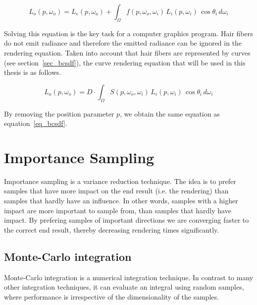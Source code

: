 \documentclass[11pt,a4paper]{report}
\begin{document}
\begin{equation}
L_o(p, \omega_o) = L_e(p, \omega_o) + \int_{\Omega} f(p, \omega_o, \omega_i)\, L_i(p, \omega_i)\, \cos \theta_i\, d\omega_i
\label{rendering_eq}
\end{equation}

Solving this equation is the key task for a computer graphics program. Hair fibers do not emit radiance and therefore the emitted radiance can be ignored in the rendering equation. Taken into account that hair fibers are represented by curves (see section~\ref{sec_bcsdf}), the curve rendering equation that will be used in this thesis is as follows.

\begin{equation}
L_o(p, \omega_o) = D \cdot \int_{\Omega} S(p, \omega_o, \omega_i)\, L_i(p, \omega_i)\, \cos \theta_i\, d\omega_i
\label{renderingEquation}
\end{equation}

By removing the position parameter $p$, we obtain the same equation as equation~\ref{eq_bcsdf}.

%
%

\section{Importance Sampling}
\label{basics_importance_sampling}


Importance sampling is a variance reduction technique. The idea is to prefer samples that have more impact on the end result (i.e. the rendering) than samples that hardly have an influence. In other words, samples with a higher impact are more important to sample from, than samples that hardly have impact. By prefering samples of important directions we are converging faster to the correct end result, thereby decreasing rendering times significantly.

\subsection{Monte-Carlo integration}

Monte-Carlo integration is a numerical integration technique. In contrast to many other integration techniques, it can evaluate an integral using random samples, where performance is irrespective of the dimensionality of the samples.
\end{document}
